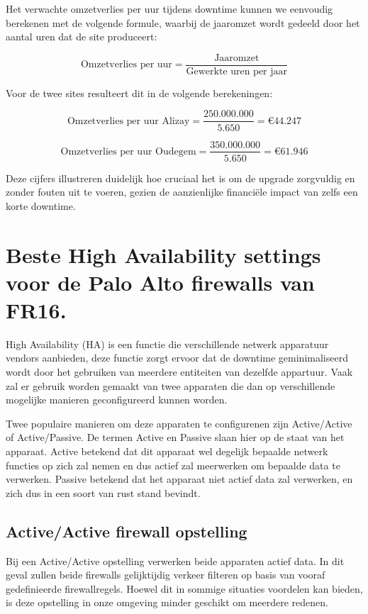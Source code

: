 Het verwachte omzetverlies per uur tijdens downtime kunnen we eenvoudig berekenen met de volgende formule, waarbij de jaaromzet wordt gedeeld door het aantal uren dat de site produceert:

\[
\text{Omzetverlies per uur} = \frac{\text{Jaaromzet}}{\text{Gewerkte uren per jaar}}
\]
\vspace{5mm}

Voor de twee sites resulteert dit in de volgende berekeningen:

\vspace{5mm}
\[
\text{Omzetverlies per uur Alizay} = \frac{250.000.000}{5.650} = €44.247
\]

\[
\text{Omzetverlies per uur Oudegem} = \frac{350.000.000}{5.650} = €61.946
\]

Deze cijfers illustreren duidelijk hoe cruciaal het is om de upgrade zorgvuldig en zonder fouten uit te voeren, gezien de aanzienlijke financiële impact van zelfs een korte downtime.


\section{Beste High Availability settings voor de Palo Alto firewalls van FR16.}


High Availability (HA) is een functie die verschillende netwerk apparatuur vendors aanbieden, deze functie zorgt ervoor dat de downtime geminimaliseerd wordt door het gebruiken van meerdere entiteiten van dezelfde appartuur. Vaak zal er gebruik worden gemaakt van twee apparaten die dan op verschillende mogelijke manieren geconfigureerd kunnen worden. 

\vspace{5mm}Twee populaire manieren om deze apparaten te configurenen zijn Active/Active of Active/Passive. De termen Active en Passive slaan hier op de staat van het apparaat. Active betekend dat dit apparaat wel degelijk bepaalde netwerk functies op zich zal nemen en dus actief zal meerwerken om bepaalde data te verwerken. Passive betekend dat het apparaat niet actief data zal verwerken, en zich dus in een soort van rust stand bevindt.

\subsection{Active/Active firewall opstelling}
Bij een Active/Active opstelling verwerken beide apparaten actief data. In dit geval zullen beide firewalls gelijktijdig verkeer filteren op basis van vooraf gedefinieerde firewallregels. Hoewel dit in sommige situaties voordelen kan bieden, is deze opstelling in onze omgeving minder geschikt om meerdere redenen.
\newline



